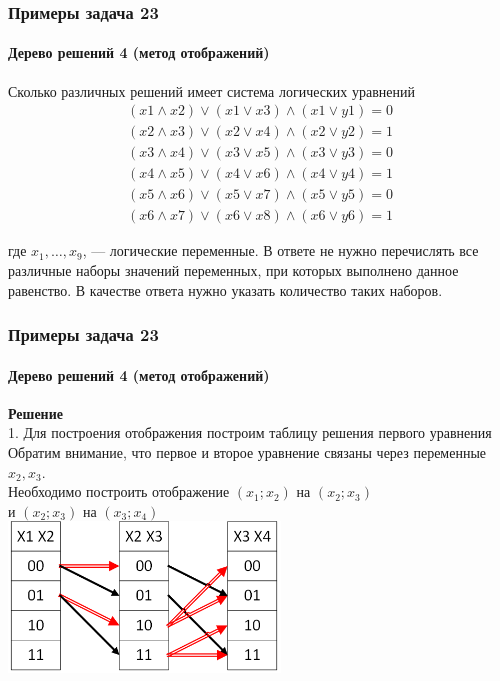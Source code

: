 \begin{frame}[t]
\frametitle{Примеры задача 23}
\framesubtitle{Дерево решений 4 (метод отображений)}
Сколько различных решений имеет система логических уравнений 
\begin{align*}
(x1 \wedge x2) \vee (x1 \vee x3) \wedge (x1 \vee y1)=0\\
(x2 \wedge x3) \vee (x2 \vee x4) \wedge (x2 \vee y2)=1\\
(x3 \wedge x4) \vee (x3 \vee x5) \wedge (x3 \vee y3)=0\\
(x4 \wedge x5) \vee (x4 \vee x6) \wedge (x4 \vee y4)=1\\
(x5 \wedge x6) \vee (x5 \vee x7) \wedge (x5 \vee y5)=0\\
(x6 \wedge x7) \vee (x6 \vee x8)  \wedge (x6 \vee y6)=1
\end{align*}

где $x_1, \ldots, x_{9}$, --- логические переменные. В ответе не нужно перечислять все различные наборы значений переменных, при которых выполнено данное равенство. В качестве ответа нужно указать количество таких наборов.
	
\end{frame}

\begin{frame}[t]
\frametitle{Примеры задача 23}
\framesubtitle{Дерево решений 4 (метод отображений)}

\textbf{Решение}\\
1.	Для построения отображения построим таблицу решения первого уравнения 
Обратим внимание, что первое и второе уравнение связаны через переменные $x_2, x_3$. \\
Необходимо построить отображение $(x_1;x_2)$ на $(x_2;x_3)$ \\и $(x_2;x_3)$ на $(x_3;x_4)$\\
\includegraphics[height=4cm]{images/t23_3}


	
\end{frame}

